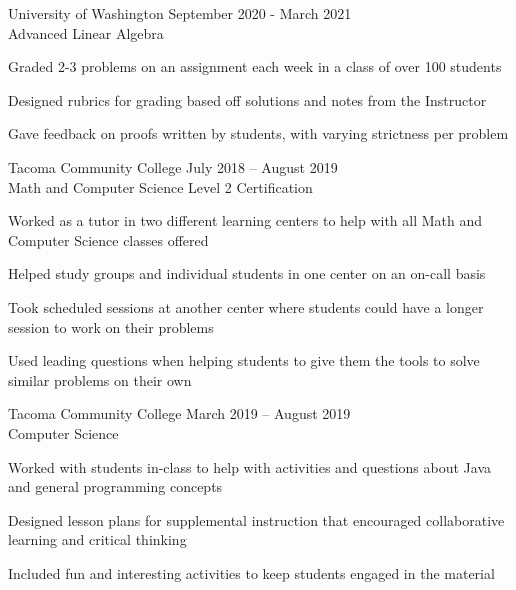 \documentclass[10pt]{article}
\newenvironment{itemize*}
{\begin{itemize}[leftmargin=*]
    \setlength{\parskip}{0.5pt}}
{\end{itemize}}
\begin{document}
\begin{description}[leftmargin=!,
                    labelwidth=\widthof{\bfseries Grader}]
\item[Grader] University of Washington \hfill
    September 2020 - March 2021\\
    Advanced Linear Algebra
\end{description}
\begin{itemize*}
\item Graded 2-3 problems on an assignment each week in a class of over 100 students
\item Designed rubrics for grading based off solutions and notes from the Instructor
\item Gave feedback on proofs written by students, with varying strictness per problem
\end{itemize*}
\vspace{10pt}

\begin{description}[leftmargin=!,
                    labelwidth=\widthof{\bfseries Internationally Certified Tutor}]

\item[Internationally Certified Tutor] Tacoma Community College \hfill
    July 2018 – August 2019\\
    Math and Computer Science \hfill Level 2 Certification
\end{description}

\begin{itemize*}
\item Worked as a tutor in two different learning centers to help
      with all Math and Computer Science classes offered
\item Helped study groups and individual students in one center on an on-call basis
\item Took scheduled sessions at another center where students could have a
      longer session to work on their problems
\item Used leading questions when helping students to give them the tools to
      solve similar problems on their own
\end{itemize*}
\vspace{10pt}

\begin{description}[leftmargin=!,
                    labelwidth=\widthof{\bfseries Supplementary Instruction Leader}]

\item[Supplementary Instruction Leader] Tacoma Community College \hfill
    March 2019 – August 2019\\
    Computer Science
\end{description}
\begin{itemize*}
\item Worked with students in-class to help with activities and questions about
      Java and general programming concepts
\item Designed lesson plans for supplemental instruction that
      encouraged collaborative learning and critical thinking
\item Included fun and interesting activities to keep students engaged in the material
\end{itemize*}
\end{document}
